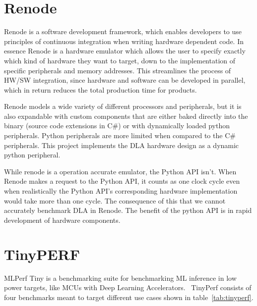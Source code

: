 \documentclass[12pt,a4paper,english
]{tunithesis}
\begin{document}
\section{Renode}
\label{sec:renode}
Renode is a software development framework, which enables developers to use principles of continuous integration when writing hardware dependent code. In essence Renode is a hardware emulator which allows the user to specify exactly which kind of hardware they want to target, down to the implementation of specific peripherals and memory addresses. This streamlines the process of HW/SW integration, since hardware and software can be developed in parallel, which in return reduces the total production time for products.

Renode models a wide variety of different processors and peripherals, but it is also expandable with custom components that are either baked directly into the binary (source code extensions in C\#) or with dynamically loaded python peripherals. Python peripherals are more limited when compared to the C\# peripherals. This project implements the DLA hardware design as a dynamic python peripheral.

While renode is a operation accurate emulator, the Python API isn't. When Renode makes a request to the Python API, it counts as one clock cycle even when realistically the Python API's corresponding hardware implementation would take more than one cycle. The consequence of this that we cannot accurately benchmark DLA in Renode. The benefit of the python API is in rapid development of hardware components.


\section{TinyPERF}
MLPerf Tiny is a benchmarking suite for benchmarking ML inference in low power targets, like MCUs with Deep Learning Accelerators.~\parencite{tinyperf}
TinyPerf consists of four benchmarks meant to target different use cases shown in table~\ref{tab:tinyperf}.
\end{document}
